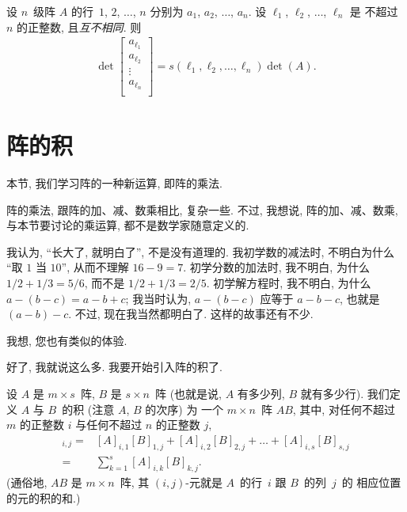 \begin{theorem}
    设 \(n\)~级阵 \(A\) 的行~\(1\), \(2\), \(\dots\), \(n\)
    分别为 \(a_1\), \(a_2\), \(\dots\), \(a_n\).
    设 \(\ell_1\), \(\ell_2\), \(\dots\), \(\ell_n\) 是%
    不超过 \(n\) 的正整数,
    且\emph{互不相同}.
    则
    \begin{align*}
        \det {\begin{bmatrix}
                      a_{\ell_1} \\
                      a_{\ell_2} \\
                      \vdots     \\
                      a_{\ell_n} \\
                  \end{bmatrix}
        }
        = s(\ell_1, \ell_2, \dots, \ell_n) \det {(A)}.
    \end{align*}
\end{theorem}

\section{阵的积}

本节, 我们学习阵的一种新运算, 即阵的乘法.

阵的乘法, 跟阵的加、减、数乘相比, 复杂一些.
不过,
我想说,
阵的加、减、数乘, 与本节要讨论的乘运算,
都不是数学家随意定义的.

我认为,
``长大了, 就明白了'',
不是没有道理的.
我初学数的减法时, 不明白为什么
``取 \(1\) 当 \(10\)'',
从而不理解 \(16 - 9 = 7\).
初学分数的加法时, 我不明白,
为什么 \(1/2 + 1/3 = 5/6\),
而不是 \(1/2 + 1/3 = 2/5\).
初学解方程时,
我不明白, 为什么 \(a - (b - c) = a - b + c\);
我当时认为, \(a - (b - c)\)
应等于 \(a - b - c\),
也就是 \((a - b) - c\).
不过, 现在我当然都明白了.
这样的故事还有不少.

我想, 您也有类似的体验.

好了, 我就说这么多.
我要开始引入阵的积了.

\begin{definition}
    设 \(A\) 是 \(m \times s\)~阵,
    \(B\) 是 \(s \times n\)~阵
    (也就是说, \(A\) 有多少列, \(B\) 就有多少行).
    我们定义 \(A\) 与 \(B\)~的积 (注意 \(A\), \(B\) 的次序) 为%
    一个 \(m \times n\)~阵 \(AB\),
    其中, 对任何不超过 \(m\) 的正整数 \(i\)
    与任何不超过 \(n\) 的正整数 \(j\),
    \begin{align*}
        [AB]_{i,j}
        = {} &
        [A]_{i,1} [B]_{1,j}
        + [A]_{i,2} [B]_{2,j}
        + \dots
        + [A]_{i,s} [B]_{s,j}
        \\
        = {} &
        \sum_{k = 1}^{s} {[A]_{i,k} [B]_{k,j}}.
    \end{align*}
    (通俗地, \(AB\) 是 \(m \times n\)~阵,
    其 \((i, j)\)-元就是
    \(A\)~的行~\(i\) 跟 \(B\)~的列~\(j\)~的%
    相应位置的元的积的和.)
\end{definition}

